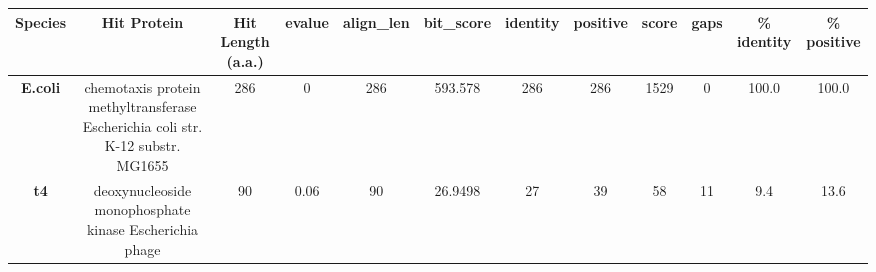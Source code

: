 \begin{tabular}{|c|c|c|c|c|c|c|c|c|c|c|c|} \hline
\textbf{Species} & \textbf{Hit Protein} & \textbf{Hit Length (a.a.)} & \textbf{evalue} & \textbf{align\_len} & \textbf{bit\_score} & \textbf{identity} & \textbf{positive} & \textbf{score} & \textbf{gaps} & \textbf{\% identity} & \textbf{\% positive} \\ \hline
\textbf{E.coli} & chemotaxis protein methyltransferase Escherichia coli str. K-12 substr. MG1655 & 286 & 0 & 286 & 593.578 & 286 & 286 & 1529 & 0 & 100.0 & 100.0\\
\textbf{t4} & deoxynucleoside monophosphate kinase Escherichia phage  & 90 & 0.06 & 90 & 26.9498 & 27 & 39 & 58 & 11 & 9.4 & 13.6\\
\hline \end{tabular}

